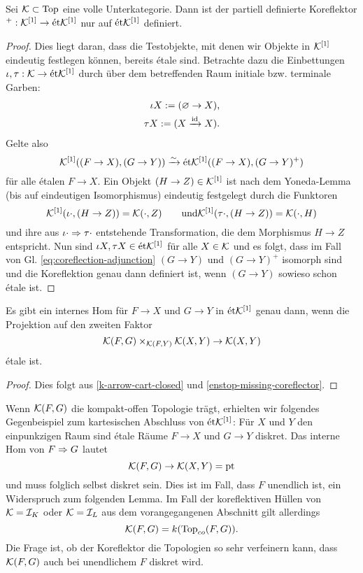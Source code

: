 \begin{satz} \label{enstop-missing-coreflector}
  Sei $\mathcal{K} \subset \operatorname{Top}$ eine volle Unterkategorie. Dann ist der
  partiell definierte Koreflektor $^+: \mathcal{K}^{[1]} \to \mathrm{\acute{e}t} \mathcal{K}^{[1]}$ nur
  auf $\mathrm{\acute{e}t} \mathcal{K}^{[1]}$ definiert.
\end{satz}
\begin{proof}
  Dies liegt daran, dass die Testobjekte, mit denen wir Objekte in
  $\mathcal{K}^{[1]}$ eindeutig festlegen können, bereits étale sind. Betrachte
  dazu die Einbettungen $\iota, \tau: \mathcal{K} \to \mathrm{\acute{e}t} \mathcal{K}^{[1]}$ durch über
  dem betreffenden Raum initiale bzw. terminale Garben:
  \begin{align*}
    \iota X := (\varnothing \to X), \\
    \tau X := (X \xrightarrow{\operatorname{id}} X).
  \end{align*}
  Gelte also
  \begin{equation} \label{eq:coreflection-adjunction}
    \mathcal{K}^{[1]}((F \to X), (G \to Y)) \xrightarrow[]{\sim} \mathrm{\acute{e}t} \mathcal{K}^{[1]}((F \to X), (G \to Y)^+)
  \end{equation}
  für alle étalen $F \to X$. Ein Objekt $(H \to Z) \in \mathcal{K}^{[1]}$ ist
  nach dem Yoneda-Lemma (bis auf eindeutigen Isomorphismus) eindeutig
  festgelegt durch die Funktoren
  \[ \mathcal{K}^{[1]}(\iota \cdot, (H \to Z)) = \mathcal{K}(\cdot, Z) \qquad \text{und} \\
  \mathcal{K}^{[1]}(\tau \cdot, (H \to Z)) = \mathcal{K}(\cdot, H)
  \]
  und ihre aus $\iota \cdot \Rightarrow \tau \cdot$ entstehende
  Transformation, die dem Morphismus $H \to Z$ entspricht. Nun sind
  $\iota X, \tau X \in \mathrm{\acute{e}t} \mathcal{K}^{[1]}$ für alle $X \in \mathcal{K}$ und es folgt,
  dass im Fall von Gl. \ref{eq:coreflection-adjunction} $(G \to Y)$
  und $(G \to Y)^+$ isomorph sind und die Koreflektion genau dann
  definiert ist, wenn $(G \to Y)$ sowieso schon étale ist.
\end{proof}
\begin{kor}
  Es gibt ein internes Hom für $F \to X$ und $G \to Y$ in $\mathrm{\acute{e}t}
  \mathcal{K}^{[1]}$ genau dann, wenn die Projektion auf den zweiten Faktor
  \[ \mathcal{K}(F, G) \times_{\mathcal{K}(F, Y)} \mathcal{K}(X, Y) \to \mathcal{K}(X, Y) \]
  étale ist.
\end{kor}
\begin{proof}
  Dies folgt aus \ref{k-arrow-cart-closed} und
  \ref{enstop-missing-coreflector}.
\end{proof}
\begin{bem}
  Wenn $\mathcal{K}(F, G)$ die kompakt-offen Topologie trägt, erhielten wir
  folgendes Gegenbeispiel zum kartesischen Abschluss von $\mathrm{\acute{e}t}
  \mathcal{K}^{[1]}$: Für $X$ und $Y$ den einpunkzigen Raum sind étale Räume $F
  \to X$ und $G \to Y$ diskret. Das interne Hom von $F \Rightarrow G$ lautet
  \[ \mathcal{K}(F, G) \to \mathcal{K}(X, Y) = \operatorname{pt} \]
  und muss folglich selbst diskret sein. Dies ist im Fall, dass $F$
  unendlich ist, ein Widerspruch zum folgenden Lemma. Im Fall der
  koreflektiven Hüllen von $\mathcal{K} = \mathcal{I}_K$ oder $\mathcal{K} =
  \mathcal{I}_L$ aus dem vorangegangenen Abschnitt gilt allerdings
  \[ \mathcal{K}(F, G) = k(\operatorname{Top}_{co}(F, G)) . \]
  Die Frage ist, ob der Koreflektor die Topologien so sehr verfeinern
  kann, dass $\mathcal{K}(F, G)$ auch bei unendlichem $F$ diskret wird.
\end{bem}
